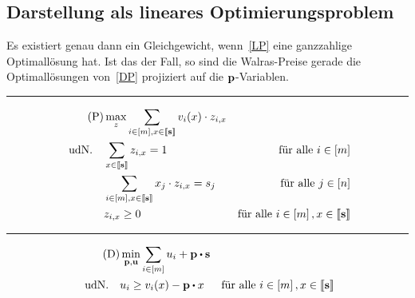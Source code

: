 \subsection{Darstellung als lineares Optimierungsproblem}
\begin{frame}
\begin{lemma}
	Es existiert genau dann ein Gleichgewicht, wenn~\eqref{LP} eine ganzzahlige Optimallösung hat.
	Ist das der Fall, so sind die Walras-Preise gerade die Optimallösungen von~\eqref{DP} projiziert auf die $\mathbf{p}$-Variablen.
	\vspace{5pt}
	\hrule
	\begin{align*}
	\tag{P}\label{LP}
	&\max_{z} \sum_{i\in\left[ m \right], x\in\left\llbracket \mathbf{s} \right\rrbracket} v_i(x) \cdot z_{i, x} \\
	\text{udN.} \quad & \sum_{x\in\left\llbracket \mathbf{s} \right\rrbracket} z_{i, x} = 1 & \text{für alle $i\in\left[ m \right]$}\\
	& \sum_{i\in\left[ m \right], x\in\left\llbracket \mathbf{s} \right\rrbracket} x_j \cdot z_{i,x} = s_j & \text{für alle $j\in\left[ n \right]$} \\
	& z_{i, x} \geq 0 &\text{für alle $i\in\left[ m \right], x\in\left\llbracket \mathbf{s} \right\rrbracket$}
	\end{align*}
	\hrule
	\begin{align*}
	\tag{D}\label{DP}
	&\min_{\fp,\fu} \sum_{i\in\first{m}} u_i + \fp \bcdot \fs \\
	\text{udN.} \quad &  u_i \geq v_i(x) - \fp \bcdot x & \text{für alle $i\in\first{m}, x\in\ffirst{\fs}$}
	\end{align*}
\end{lemma}
\end{frame}
